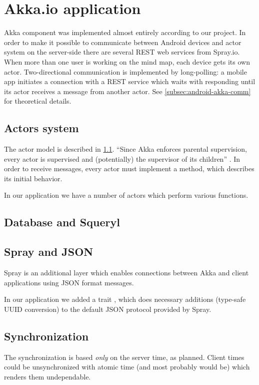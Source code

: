 \section{Akka.io application}
\label{sec:akka-app}
Akka component was implemented almost entirely according to our project. In order to make it possible to communicate between Android devices and actor system on the server-side there are several REST web services from Spray.io. When more than one user is working on the mind map, each device gets its own actor.  Two-directional communication is implemented by long-polling: a mobile app initiates a connection with a REST service which waits with responding until its actor receives a message from another actor. See \cref{subsec:android-akka-comm} for theoretical details.  

\subsection{Actors system }
\label{subsection:akka-actors}
The actor model is described in \cref{subsection:akka-actors}. ``Since Akka enforces parental supervision, every actor is supervised and (potentially) the supervisor of its children'' \cite{AkkaDoc:2013:Actors}. In order to receive messages, every actor must implement a  method, which describes its initial behavior.

In our application we have a number of actors which perform various functions.


\subsection{Database and Squeryl}
\label{subsection:akka-database}

\subsection{Spray and JSON}
\label{subsection:akka-spray}
Spray is an additional layer which enables connections between Akka and client applications using JSON format messages.

In our application we added a trait , which does necessary additions (type-safe UUID conversion) to the default JSON protocol provided by Spray.

\subsection{Synchronization}
\label{subsection:akka-synchro}
The synchronization is based \emph{only} on the server time, as planned. Client times could be unsynchronized with atomic time (and most probably would be) which renders them undependable.

